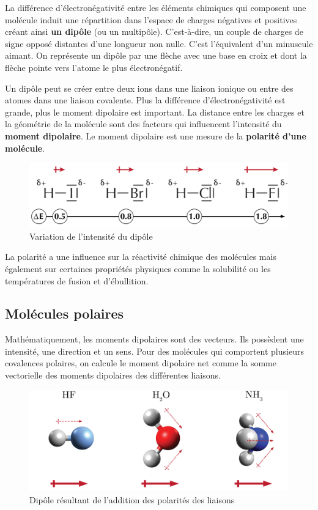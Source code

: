 \documentclass[
  11pt,
  french,
  a4paper,
  openany]{book}
\begin{document}
La différence d'électronégativité entre les éléments chimiques qui composent une molécule induit une répartition dans l'espace de charges négatives et positives créant ainsi \textbf{un dipôle} (ou un multipôle). C'est-à-dire, un couple de charges de signe opposé distantes d'une longueur non nulle. C'est l'équivalent d'un minuscule aimant. On représente un dipôle par une flèche avec une base en croix et dont la flèche pointe vers l'atome le plus électronégatif.

Un dipôle peut se créer entre deux ions dans une liaison ionique ou entre des atomes dans une liaison covalente. Plus la différence d'électronégativité est grande, plus le moment dipolaire est important. La distance entre les charges et la géométrie de la molécule sont des facteurs qui influencent l'intensité du \textbf{moment dipolaire}. Le moment dipolaire est une mesure de la \textbf{polarité d'une molécule}.

\begin{figure}

{\centering \includegraphics[width=0.6\linewidth]{images/dipole-0} 

}

\caption{Variation de l'intensité du dipôle}\label{fig:dipole-0}
\end{figure}

La polarité a une influence sur la réactivité chimique des molécules mais également sur certaines propriétés physiques comme la solubilité ou les températures de fusion et d'ébullition.

\hypertarget{moluxe9cules-polaires}{%
\subsection{Molécules polaires}\label{moluxe9cules-polaires}}

Mathématiquement, les moments dipolaires sont des vecteurs. Ils possèdent une intensité, une direction et un sens. Pour des molécules qui comportent plusieurs covalences polaires, on calcule le moment dipolaire net comme la somme vectorielle des moments dipolaires des différentes liaisons.

\begin{figure}

{\centering \includegraphics[width=0.6\linewidth]{images/dipole-1} 

}

\caption{Dipôle résultant de l'addition des polarités des liaisons}\label{fig:dipole-1}
\end{figure}
\end{document}
